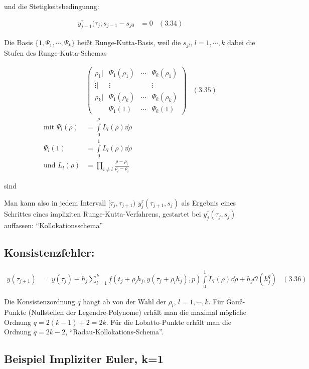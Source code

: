 und die Stetigkeitsbedingunng:

\begin{align*}
y_{j-1}^\tau (\tau_j; s_{j-1} - s_{j0} &= 0 & (3.34) 
\end{align*}

Die Basis $\{1,\Psi_1,\cdots,\Psi_k\}$ heißt Runge-Kutta-Basis, weil die $s_{jl}$, $l=1,\cdots,k$ dabei die Stufen des Runge-Kutta-Schemas

\begin{align*}
& \begin{pmatrix} \rho_1 | & \Psi_1(\rho_1) & \cdots & \Psi_k(\rho_1) \\ \vdots | & \vdots & & \vdots \\ \rho_k | & \Psi_1(\rho_k) & \cdots & \Psi_k(\rho_k) \\ & \Psi_1(1) & \cdots & \Psi_k(1) \end{pmatrix}  & (3.35)\\ 
\text{mit } \Psi_l(\rho) &= \int\limits_0^\rho L_l ( \overline \rho) \dd \overline \rho \\
\Psi_l(1) &= \int\limits_0^1 L_l (\rho) \dd \rho \\
\text{und } L_l(\rho) &= \prod\limits_{i \neq l} \frac{\rho-\rho_i}{\rho_l-\rho_i}
\end{align*}

sind

Man kann also in jedem Intervall $[\tau_j,\tau_{j+1})$ $y_j^\tau(\tau_{j+1}, s_j)$ als Ergebnis eines Schrittes eines impliziten Runge-Kutta-Verfahrens, gestartet bei $y_j^\tau (\tau_j, s_j)$ auffassen: "`Kollokationsschema"'

\subsection*{Konsistenzfehler:}

\begin{align*}
y(\tau_{j+1}) &= y(\tau_j) + h_j \sum\limits_{l=1}^k f(t_j + \rho_l h_j, y(\tau_j + \rho_l h_j), p) \int\limits_0^1 L_l(\rho) \dd \rho + h_j \mathcal O(h_j^q) & (3.36)
\end{align*}

Die Konsistenzordnung $q$ hängt ab von der Wahl der $\rho_l$, $l=1,\cdots,k$. Für Gauß-Punkte (Nullstellen der Legendre-Polynome) erhält man die maximal mögliche Ordnung $q=2(k-1)+2 = 2k$. Für die Lobatto-Punkte erhält man die Ordnung $q=2k-2$, "`Radau-Kollokations-Schema"'.

\subsection*{Beispiel Impliziter Euler, k=1}

